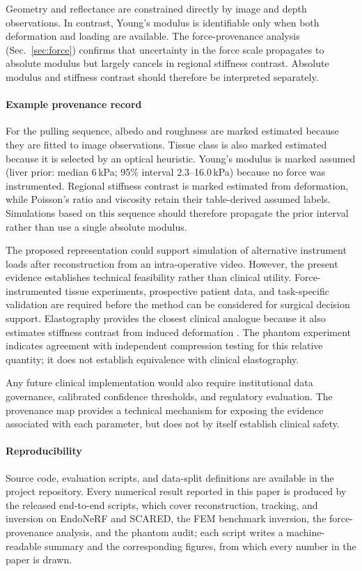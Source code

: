 \documentclass[pdflatex,lineno,referee,sn-vancouver,Numbered]{sn-jnl}
\begin{document}
Geometry and reflectance are constrained directly by image and depth
observations. In contrast, Young's modulus is identifiable only when both
deformation and loading are available. The force-provenance analysis
(Sec.~\ref{sec:force}) confirms that uncertainty in the force scale
propagates to absolute modulus but largely cancels in regional stiffness
contrast. Absolute modulus and stiffness contrast should therefore be
interpreted separately.

\paragraph{Example provenance record}
For the pulling sequence, albedo and roughness are marked estimated because
they are fitted to image observations. Tissue class is also marked estimated
because it is selected by an optical heuristic. Young's modulus is marked
assumed (liver prior: median 6\,kPa; 95\% interval 2.3--16.0\,kPa) because
no force was instrumented. Regional stiffness contrast is marked estimated
from deformation, while Poisson's ratio and viscosity retain their
table-derived assumed labels. Simulations based on this sequence should
therefore propagate the prior interval rather than use a single absolute
modulus.

The proposed representation could support simulation of alternative
instrument loads after reconstruction from an intra-operative video.
However, the present evidence establishes technical feasibility rather
than clinical utility. Force-instrumented tissue experiments, prospective
patient data, and task-specific validation are required before the method
can be considered for surgical decision support. Elastography provides the
closest clinical analogue because it also estimates stiffness contrast
from induced deformation \cite{ophir1991}. The phantom experiment indicates
agreement with independent compression testing for this relative
quantity; it does not establish equivalence with clinical elastography.

Any future clinical implementation would also require institutional data
governance, calibrated confidence thresholds, and regulatory evaluation.
The provenance map provides a technical mechanism for exposing the
evidence associated with each parameter, but does not by itself establish
clinical safety.

\paragraph{Reproducibility}\label{sec:repro}
Source code, evaluation scripts, and data-split definitions are available
in the project repository. Every numerical result
reported in this paper is produced by the released end-to-end scripts,
which cover reconstruction, tracking, and inversion on EndoNeRF and SCARED, the FEM
benchmark inversion, the force-provenance analysis, and the phantom audit;
each script writes a machine-readable summary and the corresponding
figures, from which every number in the paper is drawn.
\end{document}
